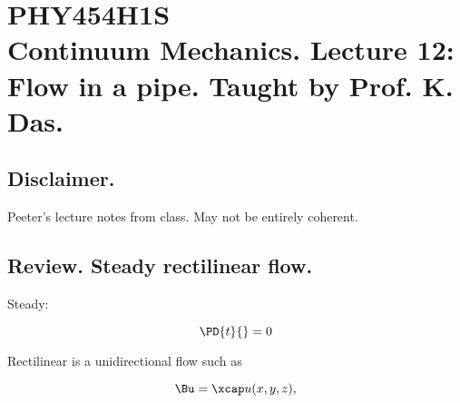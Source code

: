 
%

\chapter{PHY454H1S\\Continuum Mechanics.  Lecture 12: Flow in a pipe.  Taught by Prof. K. Das.}
\label{chap:continuumL12}
{}
\date{Feb 12, 2012}

\beginArtWithToc

\section{Disclaimer.}

Peeter's lecture notes from class.  May not be entirely coherent.

\section{Review.  Steady rectilinear flow.}

Steady:

\begin{equation}\label{eqn:continuumL12:10}
\PD{t}{} = 0
\end{equation}

Rectilinear is a unidirectional flow such as

\begin{equation}\label{eqn:continuumL12:30}
\Bu = \xcap u( x, y, z ),
\end{equation}

